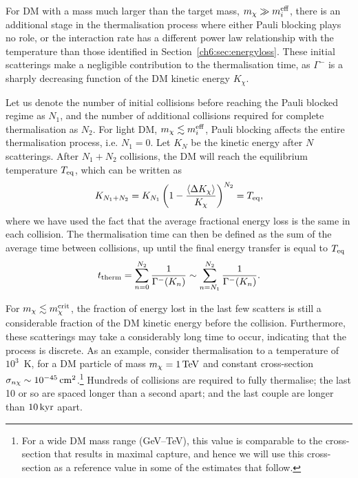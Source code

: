 For DM with a mass much larger than the target mass, $m_\chi\gg m_i^{\rm eff}$, there is an additional stage in the thermalisation process where either Pauli blocking plays no role, or the interaction rate has a different power law relationship with the temperature than those identified in Section~\ref{ch6:sec:energyloss}. These initial scatterings make a negligible contribution to the thermalisation time, as  $\Gamma^{-}$ is a sharply decreasing function of the DM kinetic energy $K_\chi$. 

 
Let us denote the number of initial collisions before reaching the Pauli blocked regime as $N_1$, and the number of additional collisions required for complete thermalisation as $N_2$. For light DM, $m_\chi\lesssim m_i^{\rm eff}$, Pauli blocking affects the entire thermalisation process, i.e. $N_1=0$. Let $K_N$ be the kinetic energy after $N$ scatterings. After $N_1+N_2$ collisions, the DM will reach the equilibrium temperature $T_{\rm eq}$, which can be written as
\begin{equation}
K_{N_1+N_2} = 
K_{N_1}\left(1-\frac{\langle \Delta K_\chi \rangle}{K_\chi}\right)^{N_2} = T_{\rm eq},  
\label{ch6:eq:Teq}
\end{equation}
where we have used the fact that the average fractional energy loss is the same in each collision. 
The thermalisation time can then be defined as the sum of the average time between collisions, up until the final energy transfer is equal to $T_{\rm eq}$~\cite{Bertoni:2013bsa_dec_DarkMatterThermalization}
\begin{equation}
t_{\rm therm} = \sum_{n=0}^{N_2} \frac{1}{\Gamma^{-}(K_n)} \sim \sum_{n=N_1}^{N_2} \frac{1}{\Gamma^{-}(K_n)}.  
\label{ch6:eq:thermtime}
\end{equation}


For  $m_\chi \lesssim m_\chi^{\rm crit}$, the fraction of energy lost in the last few scatters is still a considerable fraction of the DM kinetic energy before the collision. Furthermore, these scatterings may take a considerably long time to occur, indicating that the process is discrete. 
As an example, consider thermalisation to a temperature of $10^3$~K, for a DM particle of mass $m_\chi=1{\rm \,TeV}$ and constant cross-section $\sigma_{n\chi} \sim 10^{-45}{\rm \,cm}^2$.\footnote{ For a wide DM mass range (GeV--TeV), this value is comparable to the cross-section that results in maximal capture, and hence we will use this cross-section as a reference value in some of the estimates that follow.} Hundreds of collisions are required to fully thermalise; the last 10 or so are spaced longer than a second apart; and the last couple are longer than $10 {\rm \,kyr}$ apart.    

